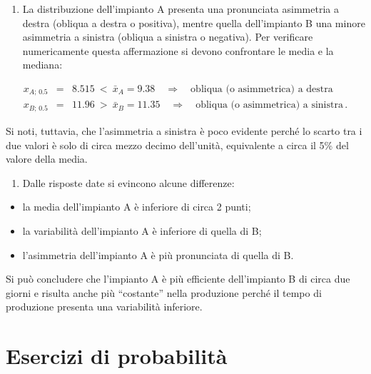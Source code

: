 \documentclass[
  11pt,
]{book}
\providecommand{\tightlist}{%
  \setlength{\itemsep}{0pt}\setlength{\parskip}{0pt}}
\theoremstyle{mytheoremstyle}
\theoremstyle{mydefstyle}
\newenvironment{sol}
  {
  \begin{tcolorbox}[enhanced,breakable,arc=0.1mm,boxrule=1pt,colback=white,colframe=iblue,
  title=\bf \fontfamily{lmss}\selectfont \hspace{.5 cm} Soluzione,drop fuzzy shadow]

}{
\end{tcolorbox}
  }
\begin{document}
\begin{sol}

\begin{enumerate}
\def\labelenumi{\roman{enumi}.}
\tightlist
\item
  La distribuzione dell'impianto A presenta una pronunciata
  asimmetria a destra (obliqua a destra o positiva), mentre quella
  dell'impianto B una minore asimmetria a sinistra (obliqua a sinistra
  o negativa).
  Per verificare numericamente questa affermazione si devono
  confrontare le media e la mediana:
\end{enumerate}

\begin{eqnarray*}
x_{A;\, 0.5} &=& 8.515\ <\ \bar{x}_{A}= 9.38 \quad\Rightarrow\quad
                 \mbox{obliqua (o asimmetrica) a destra} \\
x_{B;\, 0.5} &=& 11.96\ >\ \bar{x}_{B}= 11.35 \quad\Rightarrow\quad
                 \mbox{obliqua (o asimmetrica) a sinistra}\, .
\end{eqnarray*}

Si noti, tuttavia, che l'asimmetria a sinistra è poco evidente
perché lo scarto tra i due valori è solo di circa mezzo decimo
dell'unità, equivalente a circa il 5\% del valore della media.

\begin{enumerate}
\def\labelenumi{\alph{enumi}.}
\setcounter{enumi}{9}
\tightlist
\item
  Dalle risposte date si evincono alcune differenze:
\end{enumerate}

\begin{itemize}
\tightlist
\item
  la media dell'impianto A è inferiore di circa 2 punti;
\item
  la variabilità dell'impianto A è inferiore di quella di B;
\item
  l'asimmetria dell'impianto A è più pronunciata di quella di B.
\end{itemize}

Si può concludere che l'impianto A è più efficiente
dell'impianto B di circa due giorni e risulta anche più
``costante'' nella produzione perché il tempo di produzione
presenta una variabilità inferiore.

\end{sol}

\chapter{Esercizi di probabilità}\label{esercizi-di-probabilituxe0}
\end{document}
